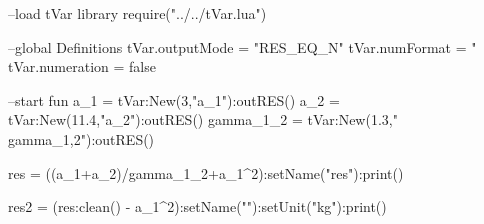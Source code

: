 \documentclass{article}
\begin{document}
\begin{luacode}
	--load tVar library
	require("../../tVar.lua")
	
	--global Definitions
	tVar.outputMode = "RES_EQ_N"
	tVar.numFormat = "%
	tVar.numeration = false
		
	--start fun
	a_1 = tVar:New(3,"a_1"):outRES()
	a_2 = tVar:New(11.4,"a_2"):outRES()
	gamma_1_2 = tVar:New(1.3,"\\gamma_{1,2}"):outRES()
	
	res = ((a_1+a_2)/gamma_1_2+a_1^2):setName("res"):print()
	
	res2 = (res:clean() - a_1^2):setName(""):setUnit("kg"):print()
\end{luacode}
\end{document}
